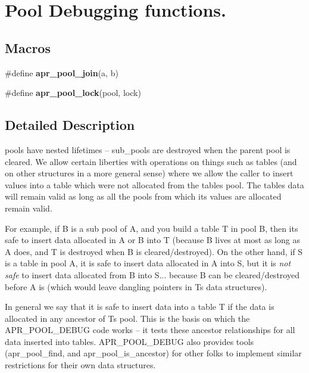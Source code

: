 \hypertarget{group___pool_debug}{}\section{Pool Debugging functions.}
\label{group___pool_debug}
\subsection*{Macros}
\begin{DoxyCompactItemize}
\item 
\mbox{\label{group___pool_debug_ga2f4a522b89e7bf12e17bf8427ec1a50f}} 
\#define {\bfseries apr\+\_\+pool\+\_\+join}(a,  b)
\item 
\mbox{\label{group___pool_debug_gaf225c04d565ebc6c37bbf018d6e407d5}} 
\#define {\bfseries apr\+\_\+pool\+\_\+lock}(pool,  lock)
\end{DoxyCompactItemize}


\subsection{Detailed Description}
pools have nested lifetimes -- sub\+\_\+pools are destroyed when the parent pool is cleared. We allow certain liberties with operations on things such as tables (and on other structures in a more general sense) where we allow the caller to insert values into a table which were not allocated from the table\textquotesingle{}s pool. The table\textquotesingle{}s data will remain valid as long as all the pools from which its values are allocated remain valid.

For example, if B is a sub pool of A, and you build a table T in pool B, then it\textquotesingle{}s safe to insert data allocated in A or B into T (because B lives at most as long as A does, and T is destroyed when B is cleared/destroyed). On the other hand, if S is a table in pool A, it is safe to insert data allocated in A into S, but it is {\itshape not safe} to insert data allocated from B into S... because B can be cleared/destroyed before A is (which would leave dangling pointers in T\textquotesingle{}s data structures).

In general we say that it is safe to insert data into a table T if the data is allocated in any ancestor of T\textquotesingle{}s pool. This is the basis on which the A\+P\+R\+\_\+\+P\+O\+O\+L\+\_\+\+D\+E\+B\+UG code works -- it tests these ancestor relationships for all data inserted into tables. A\+P\+R\+\_\+\+P\+O\+O\+L\+\_\+\+D\+E\+B\+UG also provides tools (apr\+\_\+pool\+\_\+find, and apr\+\_\+pool\+\_\+is\+\_\+ancestor) for other folks to implement similar restrictions for their own data structures.

